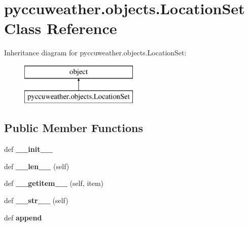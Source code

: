 \hypertarget{classpyccuweather_1_1objects_1_1_location_set}{}\section{pyccuweather.\+objects.\+Location\+Set Class Reference}
\label{classpyccuweather_1_1objects_1_1_location_set}
Inheritance diagram for pyccuweather.\+objects.\+Location\+Set\+:\begin{figure}[H]
\begin{center}
\leavevmode
\includegraphics[height=2.000000cm]{classpyccuweather_1_1objects_1_1_location_set}
\end{center}
\end{figure}
\subsection*{Public Member Functions}
\begin{DoxyCompactItemize}
\item 
\hypertarget{classpyccuweather_1_1objects_1_1_location_set_af51b3500bda3b16d0930ec86a79b76c8}{}def {\bfseries \+\_\+\+\_\+init\+\_\+\+\_\+}\label{classpyccuweather_1_1objects_1_1_location_set_af51b3500bda3b16d0930ec86a79b76c8}

\item 
\hypertarget{classpyccuweather_1_1objects_1_1_location_set_a189b48a13f608d5acb391159c5416786}{}def {\bfseries \+\_\+\+\_\+len\+\_\+\+\_\+} (self)\label{classpyccuweather_1_1objects_1_1_location_set_a189b48a13f608d5acb391159c5416786}

\item 
\hypertarget{classpyccuweather_1_1objects_1_1_location_set_a947c16f6d0d87712c1a86dc403bb061c}{}def {\bfseries \+\_\+\+\_\+getitem\+\_\+\+\_\+} (self, item)\label{classpyccuweather_1_1objects_1_1_location_set_a947c16f6d0d87712c1a86dc403bb061c}

\item 
\hypertarget{classpyccuweather_1_1objects_1_1_location_set_a77d97f02ed7d3848ad69dbe73316498e}{}def {\bfseries \+\_\+\+\_\+str\+\_\+\+\_\+} (self)\label{classpyccuweather_1_1objects_1_1_location_set_a77d97f02ed7d3848ad69dbe73316498e}

\item 
\hypertarget{classpyccuweather_1_1objects_1_1_location_set_a23452d99d69522931f6f9fa542ad200e}{}def {\bfseries append}\label{classpyccuweather_1_1objects_1_1_location_set_a23452d99d69522931f6f9fa542ad200e}

\end{DoxyCompactItemize}
